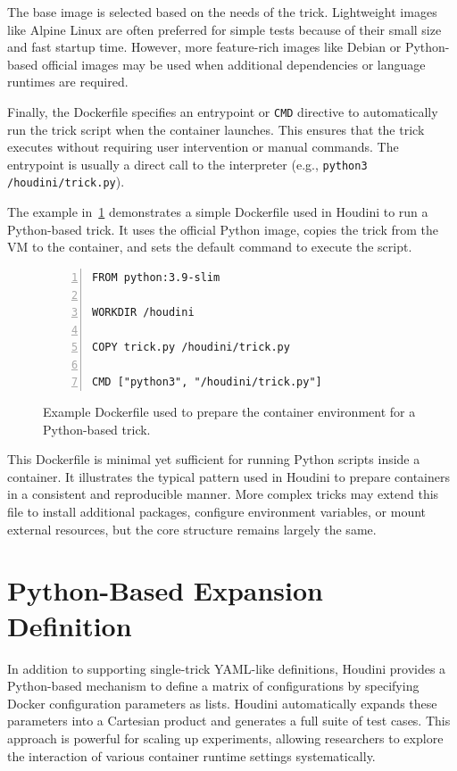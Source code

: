 \documentclass[12pt]{report}
\begin{document}
\begin{doublespace}
The base image is selected based on the needs of the trick. Lightweight images like Alpine Linux are often preferred for simple tests because of their small size and fast startup time. However, more feature-rich images like Debian or Python-based official images may be used when additional dependencies or language runtimes are required.

Finally, the Dockerfile specifies an entrypoint or \texttt{CMD} directive to automatically run the trick script when the container launches. This ensures that the trick executes without requiring user intervention or manual commands. The entrypoint is usually a direct call to the interpreter (e.g., \texttt{python3 /houdini/trick.py}).

The example in~\ref{fig:dockerfile-example} demonstrates a simple Dockerfile used in Houdini to run a Python-based trick. It uses the official Python image, copies the trick from the VM to the container, and sets the default command to execute the script.

\begin{figure}[H]
\caption{Example Dockerfile used to prepare the container environment for a Python-based trick.}
\label{fig:dockerfile-example}
\begin{lstlisting}[numbers=left, numberstyle=\tiny, stepnumber=1, breaklines=true, frame=single, backgroundcolor=\color{gray!10}, basicstyle=\ttfamily\scriptsize, showspaces=false, showstringspaces=false]
FROM python:3.9-slim

WORKDIR /houdini

COPY trick.py /houdini/trick.py

CMD ["python3", "/houdini/trick.py"]
\end{lstlisting}
\end{figure}


This Dockerfile is minimal yet sufficient for running Python scripts inside a container. It illustrates the typical pattern used in Houdini to prepare containers in a consistent and reproducible manner. More complex tricks may extend this file to install additional packages, configure environment variables, or mount external resources, but the core structure remains largely the same.


\section{Python-Based Expansion Definition}

In addition to supporting single-trick YAML-like definitions, Houdini provides a Python-based mechanism to define a matrix of configurations by specifying Docker configuration parameters as lists. Houdini automatically expands these parameters into a Cartesian product and generates a full suite of test cases. This approach is powerful for scaling up experiments, allowing researchers to explore the interaction of various container runtime settings systematically.


\end{doublespace}
\end{document}
